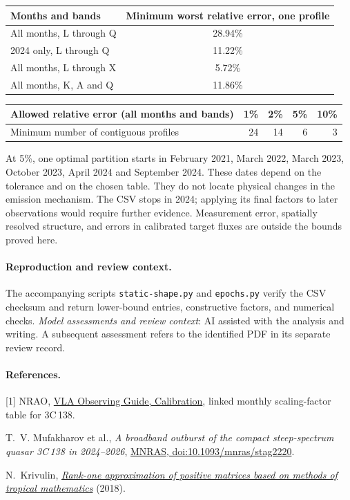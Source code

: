 \documentclass[10pt]{article}
\begin{document}
\begin{center}
\begin{tabular}{lrrr}\toprule
Months and bands & \multicolumn{3}{c}{Minimum worst relative error, one profile}\\\midrule
All months, L through Q &\multicolumn{3}{c}{28.94\%}\\
2024 only, L through Q &\multicolumn{3}{c}{11.22\%}\\
All months, L through X &\multicolumn{3}{c}{5.72\%}\\
All months, K, A and Q &\multicolumn{3}{c}{11.86\%}\\\bottomrule
\end{tabular}

\medskip
\begin{tabular}{lrrrr}\toprule
Allowed relative error (all months and bands) & 1\% & 2\% & 5\% & 10\%\\\midrule
Minimum number of contiguous profiles & 24 & 14 & 6 & 3\\\bottomrule
\end{tabular}
\end{center}
At 5\%, one optimal partition starts in February 2021, March 2022, March 2023, October 2023, April 2024 and September 2024. These dates depend on the tolerance and on the chosen table. They do not locate physical changes in the emission mechanism. The CSV stops in 2024; applying its final factors to later observations would require further evidence. Measurement error, spatially resolved structure, and errors in calibrated target fluxes are outside the bounds proved here.

\paragraph{Reproduction and review context.} The accompanying scripts \texttt{static-shape.py} and \texttt{epochs.py} verify the CSV checksum and return lower-bound entries, constructive factors, and numerical checks. \emph{Model assessments and review context}: AI assisted with the analysis and writing. A subsequent assessment refers to the identified PDF in its separate review record.

\paragraph{References.}
[1] NRAO, \href{https://science.nrao.edu/facilities/vla/docs/manuals/obsguide/calibration}{VLA Observing Guide, Calibration}, linked monthly scaling-factor table for 3C\,138.\par
[2] T.~V. Mufakharov et al., \emph{A broadband outburst of the compact steep-spectrum quasar 3C\,138 in 2024--2026}, \href{https://doi.org/10.1093/mnras/stag2220}{MNRAS, doi:10.1093/mnras/stag2220}.\par
[3] N.~Krivulin, \href{https://pureportal.spbu.ru/en/publications/rankone-approximation-of-positive-matrices-based-on-methods-of-tropical-mathematics(22d1cfd6-44dc-43b1-96a5-b443552061f7).html}{\emph{Rank-one approximation of positive matrices based on methods of tropical mathematics}} (2018).
\end{document}
